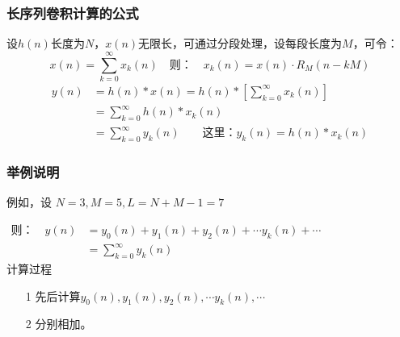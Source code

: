 \documentclass[notheorems,compress,mathserif,table]{beamer}
\begin{document}
\begin{frame}[shrink]\frametitle{长序列卷积计算的公式}%
 设$h(n)$长度为$N$，$x(n)$无限长，可通过分段处理，设每段长度为$M$，可令：
$$x(n) = \sum_{k=0}^{\infty}x_k(n) \quad\mbox{则：}\quad  x_k(n) = x(n)\cdot R_M(n-kM)$$
          \begin{equation*}
            \begin{split}
            y(n)    &= h(n)* x(n) = h(n) * \left[  \sum_{k=0}^{\infty}x_k(n)  \right]\\
                    &=  \sum_{k=0}^{\infty}  h(n) * x_k(n)  \\
                    &=  \sum_{k=0}^{\infty}  y_k(n)  \quad\quad\mbox{这里：} y_k(n)= h(n)* x_k(n)
            \end{split}
          \end{equation*}
\end{frame}

\begin{frame}[shrink]\frametitle{举例说明}%
   例如，设 $N=3,M=5,L = N+M-1=7$


        \begin{equation*}
            \begin{split}
        \mbox{则：}\quad    y(n) &= y_0(n)+y_1(n)+y_2(n)+ \cdots y_k(n)+ \cdots
                   \quad\quad\quad\quad\quad\quad\quad\quad\quad\quad\\
                 &= \sum_{k=0}^{\infty}  y_k(n)
            \end{split}
          \end{equation*}
          计算过程
          \begin{enumerate}
            \item [1] 先后计算$y_0(n),y_1(n),y_2(n), \cdots y_k(n), \cdots$
            \item [2] 分别相加。
          \end{enumerate}

\end{frame}
%
%
%
%
\end{document}
